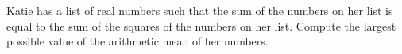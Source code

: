 Katie has a list of real numbers such that the sum of the numbers on her list is equal to the sum of the squares of the numbers on her list. Compute the largest possible value of the arithmetic mean of her numbers.
